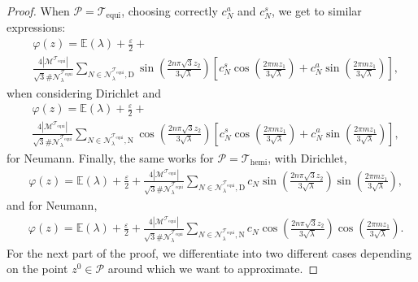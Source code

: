 \documentclass{amsart}
\theoremstyle{definition}
\theoremstyle{remark}
\newcommand{\ep}{\varepsilon}
\newcommand{\vp}{\varphi}
\numberwithin{equation}{section}
\theoremstyle{definition}
\theoremstyle{remark}
\begin{document}
\begin{proof}
	When $\mathcal{P}=	\mathcal{T}_\mathrm{equi}$, choosing correctly $c_N^a$ and $c_N^s$, we get to similar expressions:
	\begin{equation}
		\begin{aligned}
			&\vp(z)=\mathbb{E}(\lambda)+\frac{\ep}{2}+\\&\frac{4|\mathcal{M}^{	\mathcal{T}_\mathrm{equi}}|}{\sqrt{3}\#\mathcal{N}_\lambda^{\mathcal{T}_\mathrm{equi}}}\sum_{N\in \mathcal{N}_\lambda^{	\mathcal{T}_\mathrm{equi}},\mathrm{D}} \sin\left(\frac{2n\pi\sqrt{3}z_2}{3\sqrt{\lambda}}\right)\left[c_N^s\cos\left(\frac{2\pi mz_1}{3\sqrt{\lambda}}\right)+c_N^a\sin\left(\frac{2\pi mz_1}{3\sqrt{\lambda}}\right)\right],
		\end{aligned}
	\end{equation}when considering Dirichlet and\begin{equation}
		\begin{aligned}
			&\vp(z)=\mathbb{E}(\lambda)+\frac{\ep}{2}+\\&\frac{4|\mathcal{M}^{	\mathcal{T}_\mathrm{equi}}|}{\sqrt{3}\#\mathcal{N}_\lambda^{\mathcal{T}_\mathrm{equi}}}\sum_{N\in \mathcal{N}_\lambda^{	\mathcal{T}_\mathrm{equi}},\mathrm{N}} \cos\left(\frac{2n\pi\sqrt{3}z_2}{3\sqrt{\lambda}}\right)\left[c_N^s\cos\left(\frac{2\pi mz_1}{3\sqrt{\lambda}}\right)+c_N^a\sin\left(\frac{2\pi mz_1}{3\sqrt{\lambda}}\right)\right],
		\end{aligned}
	\end{equation}for Neumann.
	Finally, the same works for $\mathcal{P}=\mathcal{T}_\mathrm{hemi}$, with Dirichlet, 
	\begin{equation}
		\begin{aligned}
			&\vp(z)=\mathbb{E}(\lambda)+\frac{\ep}{2}+\frac{4|\mathcal{M}^{	\mathcal{T}_\mathrm{equi}}|}{\sqrt{3}\#\mathcal{N}_\lambda^{\mathcal{T}_\mathrm{equi}}}\sum_{N\in \mathcal{N}_\lambda^{	\mathcal{T}_\mathrm{equi}},\mathrm{D}}c_N \sin\left(\frac{2n\pi\sqrt{3}z_2}{3\sqrt{\lambda}}\right)\sin\left(\frac{2\pi mz_1}{3\sqrt{\lambda}}\right),
		\end{aligned}
	\end{equation}and for Neumann,
	\begin{equation}
		\begin{aligned}
			&\vp(z)=\mathbb{E}(\lambda)+\frac{\ep}{2}+\frac{4|\mathcal{M}^{	\mathcal{T}_\mathrm{equi}}|}{\sqrt{3}\#\mathcal{N}_\lambda^{\mathcal{T}_\mathrm{equi}}}\sum_{N\in \mathcal{N}_\lambda^{	\mathcal{T}_\mathrm{equi}},\mathrm{N}}c_N \cos\left(\frac{2n\pi\sqrt{3}z_2}{3\sqrt{\lambda}}\right)\cos\left(\frac{2\pi mz_1}{3\sqrt{\lambda}}\right).
		\end{aligned}
	\end{equation}
	For the next part of the proof, we differentiate into two different cases depending on the point $z^0\in\mathcal{P}$ around which we want to approximate.
	

\end{proof}
\end{document}
